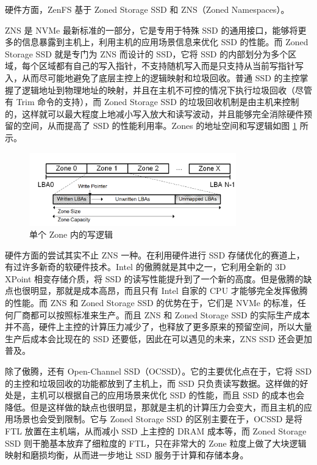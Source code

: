 硬件方面，ZenFS 基于 Zoned Storage SSD 和 ZNS（Zoned Namespaces）。

ZNS 是 NVMe 最新标准的一部分，它是专用于特殊 SSD 的通用接口，能够将更多的信息暴露到主机上，利用主机的应用场景信息来优化 SSD 的性能。而 Zoned Storage SSD 就是专门为 ZNS 而设计的 SSD，它将 SSD 的内部划分为多个区域，每个区域都有自己的写入指针，不支持随机写入而是只支持从当前写指针写入，从而尽可能地避免了底层主控上的逻辑映射和垃圾回收。普通 SSD 的主控掌握了逻辑地址到物理地址的映射，并且在主机不可控的情况下执行垃圾回收（尽管有 Trim 命令的支持\cite{liang_itrim_2021}），而 Zoned Storage SSD 的垃圾回收机制是由主机来控制的，这样就可以最大程度上地减小写入放大和读写波动，并且能够完全消除硬件预留的空间，从而提高了 SSD 的性能利用率。Zones 的地址空间和写逻辑如图 \ref{zns} 所示。

\begin{figure}[htbp]
    \centering
    \includegraphics[width=0.8\textwidth]{fig/zns}
    \caption{单个 Zone 内的写逻辑}
    \label{zns}
\end{figure}

硬件方面的尝试其实不止 ZNS 一种。在利用硬件进行 SSD 存储优化的赛道上，有过许多新奇的软硬件技术。Intel 的傲腾就是其中之一，它利用全新的 3D XPoint 相变存储介质，将 SSD 的读写性能提升到了一个新的高度。但是傲腾的缺点也很明显，那就是成本高昂，而且只有 Intel 自家的 CPU 才能够完全发挥傲腾的性能。而 ZNS 和 Zoned Storage SSD 的优势在于，它们是 NVMe 的标准，任何厂商都可以按照标准来生产。而且 ZNS 和 Zoned Storage SSD 的实际生产成本并不高，硬件上主控的计算压力减少了，也释放了更多原来的预留空间，所以大量生产后成本会比现在的 SSD 还要低，因此在可以遇见的未来，ZNS SSD 还会更加普及。

除了傲腾，还有 Open-Channel SSD（OCSSD）\cite{lu_mitigating_2019}。它的主要优化点在于，它将 SSD 的主控和垃圾回收的功能都放到了主机上，而 SSD 只负责读写数据。这样做的好处是，主机可以根据自己的应用场景来优化 SSD 的性能，而且 SSD 的成本也会降低。但是这样做的缺点也很明显，那就是主机的计算压力会变大，而且主机的应用场景也会受到限制。它与 Zoned Storage SSD 的区别主要在于，OCSSD 是将 FTL 放置在主机端，从而减小 SSD 上主控的 DRAM 成本等，而 Zoned Storage SSD 则干脆基本放弃了细粒度的 FTL，只在非常大的 Zone 粒度上做了大块逻辑映射和磨损均衡，从而进一步地让 SSD 服务于计算和存储本身。

